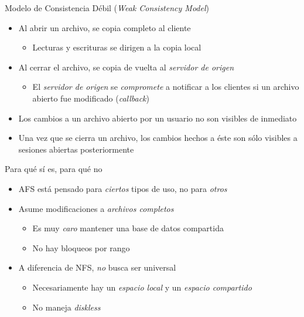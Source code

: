 \documentclass[presentation]{beamer}
\begin{document}
\begin{frame}[label={sec:org96bb0a7}]{Modelo de Consistencia Débil (\emph{Weak Consistency Model})}
\begin{itemize}
\item Al abrir un archivo, se copia completo al cliente
\begin{itemize}
\item Lecturas y escrituras se dirigen a la copia local
\end{itemize}
\item Al cerrar el archivo, se copia de vuelta al \emph{servidor de origen}
\begin{itemize}
\item El \emph{servidor de origen} se \emph{compromete} a notificar a los
clientes si un archivo abierto fue modificado (\emph{callback})
\end{itemize}
\item Los cambios a un archivo abierto por un usuario no son visibles de
inmediato
\item Una vez que se cierra un archivo, los cambios hechos a éste son
sólo visibles a sesiones abiertas posteriormente
\end{itemize}
\end{frame}

\begin{frame}[label={sec:orgaca2ffa}]{Para qué sí es, para qué no}
\begin{itemize}
\item AFS está pensado para \emph{ciertos} tipos de uso, no para \emph{otros}
\item Asume modificaciones a \emph{archivos completos}
\begin{itemize}
\item Es muy \emph{caro} mantener una base de datos compartida
\item No hay bloqueos por rango
\end{itemize}
\item A diferencia de NFS, \emph{no} busca ser universal
\begin{itemize}
\item Necesariamente hay un \emph{espacio local} y un \emph{espacio compartido}
\item No maneja \emph{diskless}
\end{itemize}
\end{itemize}
\end{frame}
\end{document}
